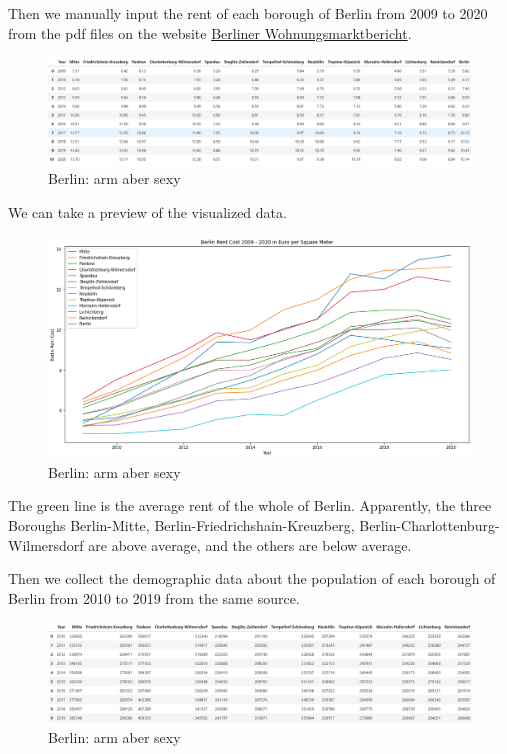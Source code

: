 \documentclass[11pt]{article}
\begin{document}
  

       
    Then we manually input the rent of each borough of Berlin from 2009 to 2020 from
the pdf files on the website
\href{https://www.stadtentwicklung.berlin.de/wohnen/wohnungsmarktbericht/}{Berliner
Wohnungsmarktbericht}.

\begin{figure}
\centering
\includegraphics[width=16.5cm]{"Screenshot (28).png"}
\caption{Berlin: arm aber sexy}
\end{figure}


        
    We can take a preview of the visualized data.

   
\begin{figure}
\centering
\includegraphics[width=16.5cm]{"output_14_0.png"}
\caption{Berlin: arm aber sexy}
\end{figure}


    
    
    The green line is the average rent of the whole of Berlin. Apparently,
the three Boroughs Berlin-Mitte, Berlin-Friedrichshain-Kreuzberg,
Berlin-Charlottenburg-Wilmersdorf are above average, and the others are
below average.

    Then we collect the demographic data about the population of each
borough of Berlin from 2010 to 2019 from the same source.

 \begin{figure}
\centering
\includegraphics[width=17cm]{"Screenshot (29).png"}
\caption{Berlin: arm aber sexy}
\end{figure}
\end{document}
